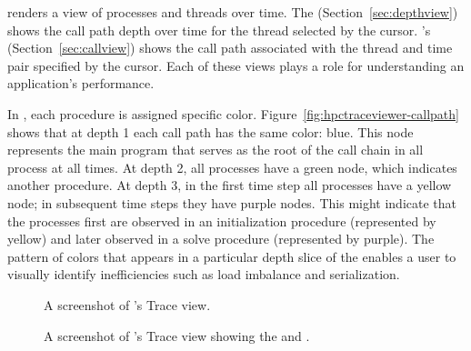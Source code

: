 \hpctraceviewer{} renders a view of processes and threads over time. The \emph{\depthview} (Section~\ref{sec:depthview}) shows the call path depth over time for the thread selected by the cursor.
\hpctraceviewer{}'s  \emph{\callview}  (Section~\ref{sec:callview}) shows the call path associated with the thread and time pair specified by the cursor. 
Each of these views plays a role for understanding an application's performance.

In \hpctraceviewer, each procedure is assigned specific color. Figure~\ref{fig:hpctraceviewer-callpath} shows that at depth 1   each call path has the same color: blue. This node represents the main program that serves as the root of the call chain in all process at all times. At depth 2, all processes have a green node, which indicates another procedure. 
At depth 3, in the first time step all processes  have a yellow node; in subsequent time steps they have purple nodes.
This might indicate that the processes first are observed in an initialization procedure (represented by yellow) and later observed in a solve procedure (represented by purple). The pattern of colors that appears in a particular depth slice of the \traceview{} enables a user to visually identify inefficiencies such as load imbalance and serialization.




\begin{figure}[t]
\caption{A screenshot of \hpcviewer{}'s Trace view.}
\label{fig:hpctraceviewer-legend}
\end{figure}

\begin{figure}[t]
\caption{A screenshot of \hpcviewer{}'s Trace view showing the \summaryview{} and \statview.}
\label{fig:hpctraceviewer-stat}
\end{figure}

